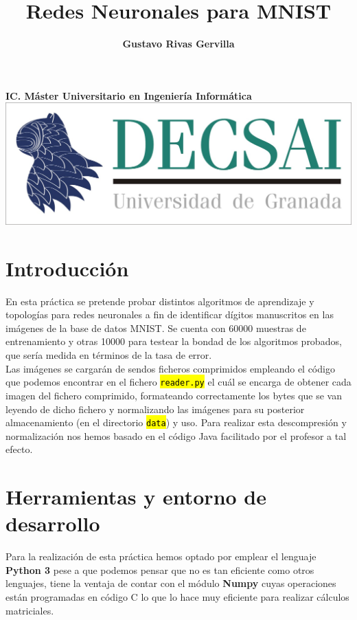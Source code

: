 \documentclass[10pt,a4paper]{article}
\author{\textbf{Gustavo Rivas Gervilla}}
\title{\textcolor{deepblue}{\textbf{Redes Neuronales para MNIST}}}
\date{}
\newcommand{\archive}[1]{\sethlcolor{light-green}\hl{\texttt{#1}}} %
\begin{document}
\maketitle
\begin{center}
\textbf{IC. Máster Universitario en Ingeniería Informática}
\newline
\newline
\newline
\includegraphics[scale=0.5]{img/decsai}
\end{center}

\newpage
\tableofcontents
\newpage

\def\layersep{2.5cm}

\section{Introducción}

En esta práctica se pretende probar distintos algoritmos de aprendizaje y topologías para redes neuronales a fin de identificar dígitos manuscritos en las imágenes de la base de datos MNIST. Se cuenta con 60000 muestras de entrenamiento y otras 10000 para testear la bondad de los algoritmos probados, que sería medida en términos de la tasa de error.\\

Las imágenes se cargarán de sendos ficheros comprimidos empleando el código que podemos encontrar en el fichero \archive{reader.py} el cuál se encarga de obtener cada imagen del fichero comprimido, formateando correctamente los bytes que se van leyendo de dicho fichero y normalizando las imágenes para su posterior almacenamiento (en el directorio \archive{data}) y uso. Para realizar esta descompresión y normalización nos hemos basado en el código Java facilitado por el profesor a tal efecto.

\section{Herramientas y entorno de desarrollo}
Para la realización de esta práctica hemos optado por emplear el lenguaje \textbf{Python 3} pese a que podemos pensar que no es tan eficiente como otros lenguajes, tiene la ventaja de contar con el módulo \textbf{Numpy} cuyas operaciones están programadas en código C lo que lo hace muy eficiente para realizar cálculos matriciales.\\
\end{document}
